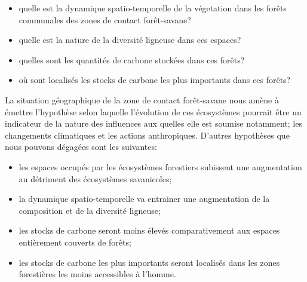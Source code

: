 \documentclass[
  12pt,
  a4paper,
  extrafontsizes,
  onecolumn,
  openright]{book}
\theoremstyle{definition}
\theoremstyle{definition}
\theoremstyle{definition}
\theoremstyle{definition}
\theoremstyle{remark}
\begin{document}
\begin{itemize}
systèmes d'aménagement et de gestion durable mis en place dans les forêts communales et suivant le contexte des changements climatiques, nécessite une tenue régulière des inventaires floristiques et la caractérisation des stocks de carbone dans ces espaces. La plupart des études antérieures ont généralement porté sur l'étude des impacts de l'exploitation forestère sur les stocks de carbone ( \citep{Kankeu2013, Nanda2018}. D'autres travaux se sont intéressés à l'étude de l'évolutiondu couvert végétal par des techniques de télédetection \citep{Momo2018, Djiongo2019, Zekeng2020} et peu d'études ont été faites sur la biodiversité et la croissance des ligneux en rapport avec les stocks de carbone. La pertinence de cette étude découle du fait qu'en ciblant la dynamique de la biodiversité et des stocks de carbone dans les forêts communales situées dans la zone de contact forêt-savane, elle permettra de mieux comprendre leur fonction potentielle dans l'atténuation du rechauffement climatique ainsi que les mécanismes qui gouvernent l'évolution de la biodiversité et des stocks de carbone dans un contexte de gestion forestière décentralisée. La question générale qui se dégage est la suivante : quels sont les mécanismes qui soutendent la dynamique de la biodiversité et les stocks de carbone dans les zones de contact forêt-savane et dans des systèmes de gestion forestière associés aux populations locales? spécifiquement il s'agit de répondre aux questions suivantes:
\item
  quelle est la dynamique spatio-temporelle de la végetation dans les forêts communales des zones de contact forêt-savane?
\item
  quelle est la nature de la diversité ligneuse dans ces espaces?
\item
  quelles sont les quantités de carbone stockées dans ces forêts?
\item
  où sont localisés les stocks de carbone les plus importants dans ces forêts?
\end{itemize}

La situation géographique de la zone de contact forêt-savane nous amène à émettre l'hypothèse selon laquelle l'évolution de ces écosystèmes pourrait être un indicateur de la nature des influences aux quelles elle est soumise notamment; les changements climatiques et les actions anthropiques.
D'autres hypothèses que nous pouvons dégagées sont les suivantes:

\begin{itemize}
\item
  les espaces occupés par les écosystèmes forestiers subissent une augmentation au détriment des écosystèmes savanicoles;
\item
  la dynamique spatio-temporelle va entrainer une augmentation de la composition et de la diversité ligneuse;
\item
  les stocks de carbone seront moins élevés comparativement aux espaces entièrement couverts de forêts;
\item
  les stocks de carbone les plus importants seront localisés dans les zones forestières les moins accessibles à l'homme.
\end{itemize}
\end{document}
